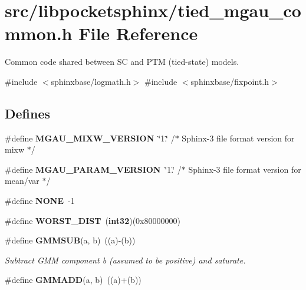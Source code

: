 \section{src/libpocketsphinx/tied\-\_\-mgau\-\_\-common.h \-File \-Reference}
\label{tied__mgau__common_8h}


\-Common code shared between \-S\-C and \-P\-T\-M (tied-\/state) models.  


{\ttfamily \#include $<$sphinxbase/logmath.\-h$>$}\*
{\ttfamily \#include $<$sphinxbase/fixpoint.\-h$>$}\*
\subsection*{\-Defines}
\begin{DoxyCompactItemize}
\item 
\#define {\bfseries \-M\-G\-A\-U\-\_\-\-M\-I\-X\-W\-\_\-\-V\-E\-R\-S\-I\-O\-N}~\char`\"{}1.\char`\"{}   /$\ast$ \-Sphinx-\/3 file format version for mixw $\ast$/\label{tied__mgau__common_8h_a6b148848668aa5ddeb21f9e5726f8205}

\item 
\#define {\bfseries \-M\-G\-A\-U\-\_\-\-P\-A\-R\-A\-M\-\_\-\-V\-E\-R\-S\-I\-O\-N}~\char`\"{}1.\char`\"{}   /$\ast$ \-Sphinx-\/3 file format version for mean/var $\ast$/\label{tied__mgau__common_8h_a14319cfdc013dfddf30896654b6e6500}

\item 
\#define {\bfseries \-N\-O\-N\-E}~-\/1\label{tied__mgau__common_8h_a655c84af1b0034986ff56e12e84f983d}

\item 
\#define {\bfseries \-W\-O\-R\-S\-T\-\_\-\-D\-I\-S\-T}~({\bf int32})(0x80000000)\label{tied__mgau__common_8h_a9512d04e0db6aa7d0c857071935df145}

\item 
\#define {\bf \-G\-M\-M\-S\-U\-B}(a, b)~((a)-\/(b))\label{tied__mgau__common_8h_a740dfe5b30e702ba8b2ec7426bd4d57e}

\begin{DoxyCompactList}\small\item\em \-Subtract \-G\-M\-M component b (assumed to be positive) and saturate. \end{DoxyCompactList}\item 
\#define {\bfseries \-G\-M\-M\-A\-D\-D}(a, b)~((a)+(b))\label{tied__mgau__common_8h_a1f6b744cf1ced48452fcb90b5b0ccde2}


\end{DoxyCompactItemize}
